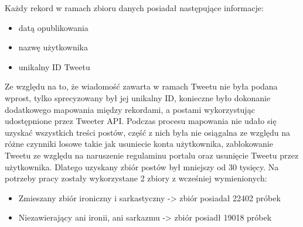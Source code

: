 Każdy rekord w ramach zbioru danych posiadał następujące informacje:
\begin{itemize}
    \item datą opublikowania
    \item nazwę użytkownika
    \item unikalny ID Tweetu
\end{itemize}




Ze względu na to, że wiadomość zawarta w ramach Tweetu nie była podana wprost, tylko sprecyzowany był jej unikalny ID, konieczne było dokonanie dodatkowego mapowania między rekordami, a postami wykorzystując udostępnione przez Tweeter API. Podczas procesu mapowania nie udało się uzyskać wszystkich treści postów, część z nich była nie osiągalna ze względu na różne czynniki losowe takie jak usuniecie konta użytkownika, zablokowanie Tweetu ze względu na naruszenie regulaminu portalu oraz usunięcie Tweetu przez użytkownika. Dlatego uzyskany zbiór postów był mniejszy od 30 tysięcy.  
Na potrzeby pracy zostały wykorzystane 2 zbiory z wcześniej wymienionych:
\begin{itemize}
    \item Zmieszany zbiór ironiczny i sarkastyczny -> zbiór posiadał 22402 próbek
    \item Niezawierający ani ironii, ani sarkazmu -> zbiór posiadł 19018 próbek
\end{itemize}


